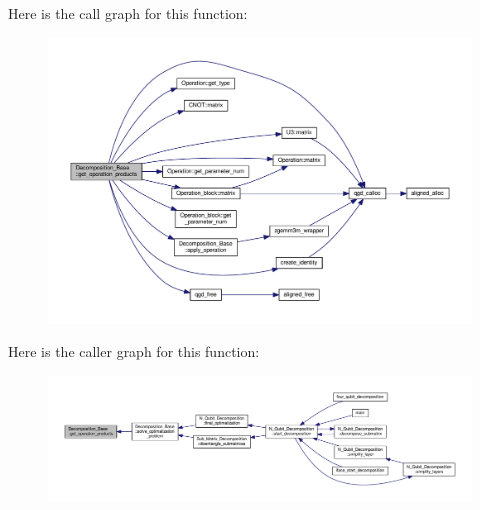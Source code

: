 Here is the call graph for this function\+:
\nopagebreak
\begin{figure}[H]
\begin{center}
\leavevmode
\includegraphics[width=350pt]{class_decomposition___base_a7f3fd202c32e65cbc312ec61d426442a_cgraph}
\end{center}
\end{figure}




Here is the caller graph for this function\+:
\nopagebreak
\begin{figure}[H]
\begin{center}
\leavevmode
\includegraphics[width=350pt]{class_decomposition___base_a7f3fd202c32e65cbc312ec61d426442a_icgraph}
\end{center}
\end{figure}



